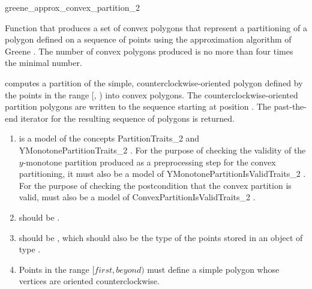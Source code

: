 \begin{ccRefFunction}{greene_approx_convex_partition_2}

\ccDefinition
Function that produces a set of 
convex polygons that represent a partitioning of a polygon defined
on a sequence of points using the approximation algorithm of 
Greene \cite{g-dpcp-83}.  The number of convex polygons produced is 
no more than four times the minimal number.%


{
computes a partition of the simple, counterclockwise-oriented polygon defined 
by the points in the range [, ) into convex 
polygons. The counterclockwise-oriented partition polygons are written to
the sequence starting at position .  The past-the-end iterator for 
the resulting sequence of polygons is returned.
}

\begin{enumerate}
    \item {} is a model of the concepts PartitionTraits\_2%
           and 
          YMonotonePartitionTraits\_2%
          . 
          For the purpose of 
          checking the validity of the $y$-monotone partition produced as
          a preprocessing step for the convex partitioning, it must also 
          be a model of YMonotonePartitionIsValidTraits\_2
          . 
          For the purpose of checking
          the postcondition that the convex partition is valid, 
          must also be a model of ConvexPartitionIsValidTraits\_2%
          . 
    \item {} should be .
    \item {} should be ,
          which should also be the type of the points stored in an object
          of type .
    \item Points in the range $[first, beyond)$ must define a simple polygon
          whose vertices are oriented counterclockwise.
\end{enumerate}


\end{ccRefFunction}
